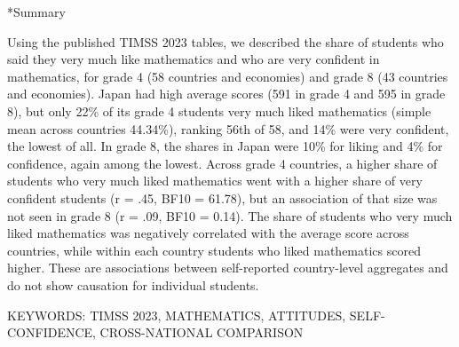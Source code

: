\documentclass[a4paper,10pt,twocolumn]{ltjsarticle}
\makeatletter
\renewcommand{\section}{\@startsection{section}{1}{\z@}{1.1\Cvs \@plus.4\Cdp \@minus.2\Cdp}{.5\Cvs \@plus.2\Cdp}{\normalfont\gtfamily\bfseries\large}}
\makeatother
\begin{document}
\section*{Summary}
{\footnotesize\setlength{\parindent}{0pt}Using the published TIMSS 2023 tables, we described the share of students who said they very much like mathematics and who are very confident in mathematics, for grade 4 (58 countries and economies) and grade 8 (43 countries and economies). Japan had high average scores (591 in grade 4 and 595 in grade 8), but only 22\% of its grade 4 students very much liked mathematics (simple mean across countries 44.34\%), ranking 56th of 58, and 14\% were very confident, the lowest of all. In grade 8, the shares in Japan were 10\% for liking and 4\% for confidence, again among the lowest. Across grade 4 countries, a higher share of students who very much liked mathematics went with a higher share of very confident students (r = .45, BF10 = 61.78), but an association of that size was not seen in grade 8 (r = .09, BF10 = 0.14). The share of students who very much liked mathematics was negatively correlated with the average score across countries, while within each country students who liked mathematics scored higher. These are associations between self-reported country-level aggregates and do not show causation for individual students.\par\smallskip KEYWORDS: TIMSS 2023, MATHEMATICS, ATTITUDES, SELF-CONFIDENCE, CROSS-NATIONAL COMPARISON\par}
\medskip\noindent{}
\end{document}
